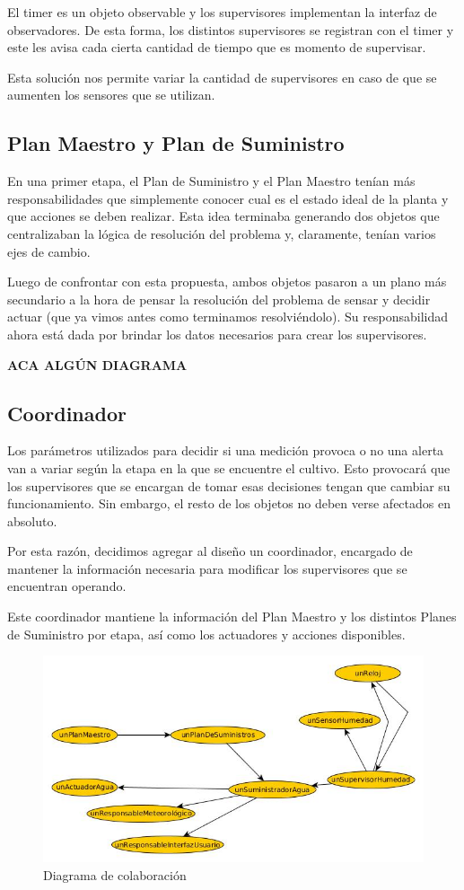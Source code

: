 El timer es un objeto observable y los supervisores implementan la interfaz de observadores. De esta forma, los distintos supervisores se registran con el timer y este les avisa cada cierta cantidad de tiempo que es momento de supervisar.

Esta solución nos permite variar la cantidad de supervisores en caso de que se aumenten los sensores que se utilizan.

\subsection{Plan Maestro y Plan de Suministro}
En una primer etapa, el Plan de Suministro y el Plan Maestro tenían más responsabilidades que simplemente conocer cual es el estado ideal de la planta y que acciones se deben realizar. Esta idea terminaba generando dos objetos que centralizaban la lógica de resolución del problema y, claramente, tenían varios ejes de cambio.

Luego de confrontar con esta propuesta, ambos objetos pasaron a un plano más secundario a la hora de pensar la resolución del problema de sensar y decidir actuar (que ya vimos antes como terminamos resolviéndolo). Su responsabilidad ahora está dada por brindar los datos necesarios para crear los supervisores.

\textbf{ACA ALGÚN DIAGRAMA}

\subsection{Coordinador}
Los parámetros utilizados para decidir si una medición provoca o no una alerta van a variar según la etapa en la que se encuentre el cultivo. Esto provocará que los supervisores que se encargan de tomar esas decisiones tengan que cambiar su funcionamiento. Sin embargo, el resto de los objetos no deben verse afectados en absoluto.

Por esta razón, decidimos agregar al diseño un coordinador, encargado de mantener la información necesaria para modificar los supervisores que se encuentran operando. 

Este coordinador mantiene la información del Plan Maestro y los distintos Planes de Suministro por etapa, así como los actuadores y acciones disponibles.

\begin{figure}[h!]
  \centering
  \includegraphics[width=1\textwidth]{./imagenes/objetosCoordinador.jpg}
  \caption{Diagrama de colaboración}
  \label{fig:sec_sum1}
\end{figure}


